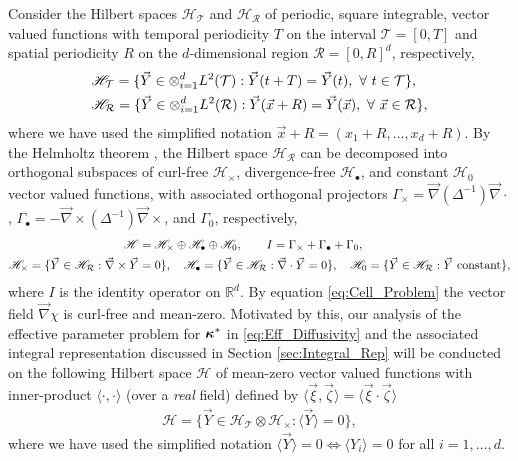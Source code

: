 \documentclass[11pt]{amsart}
\newcommand{\Tc}{\mathcal{T}}
\newcommand{\Rc}{\mathcal{R}}
\newcommand{\Hs}{\mathscr{H}}
\newcommand\bkappa{\mbox{\boldmath${\kappa}$}}
\begin{document}
Consider the Hilbert spaces $\Hs_{\Tc}$ and 
$\Hs_{\Rc}$ of periodic, square integrable, vector
valued functions with temporal periodicity $T$ on the interval
$\Tc=[0,T]$ and spatial periodicity $R$ on the $d$-dimensional
region $\Rc=[0,R]^d$, respectively,
%
\begin{align}
  &\Hs_{\Tc}=\{ 
     \vec{Y}\in\otimes_{i=1}^dL^2(\Tc):
     \vec{Y}(t+T)=\vec{Y}(t), \ \forall \ t\in\Tc
                        \}, \\
  &\Hs_{\Rc}=\{ 
     \vec{Y}\in\otimes_{i=1}^dL^2(\Rc):
     \vec{Y}(\vec{x}+R)=\vec{Y}(\vec{x}), \ \forall \ \vec{x}\in\Rc 
                        \}, \notag
\end{align}
%
where we have used the simplified notation $\vec{x}+R=(x_1+R,\ldots,x_d+R)$.
By the Helmholtz theorem \cite{Denaro:2003:0271,Bhatia:IEE:1077}, the
Hilbert space $\Hs_{\Rc}$ can be decomposed into 
orthogonal subspaces of curl-free $\Hs_\times$, divergence-free
$\Hs_\bullet$, and constant $\Hs_0$ vector valued functions,
with associated orthogonal projectors
$\Gamma_\times=\vec{\nabla}(\Delta^{-1})\vec{\nabla}\cdot$, $\Gamma_\bullet=-\vec{\nabla}\times(\Delta^{-1})\vec{\nabla}\times$, and
$\Gamma_0$, respectively, \cite{Fannjiang:SIAM_JAM:333,MILTON:2002:TC}    
%
\begin{align}\label{eq:Helmholtz}
  \Hs&=\Hs_\times\oplus\Hs_\bullet\oplus\Hs_0,\qquad
  I=\Gamma_\times+\Gamma_\bullet+\Gamma_0, \\  
  \Hs_\times
      =\{\vec{Y}\in\Hs_{\Rc}:\vec{\nabla}\times\vec{Y}&=0\}, \quad
  \Hs_\bullet
      =\{\vec{Y}\in\Hs_{\Rc}:\vec{\nabla}\cdot\vec{Y}=0\},   \quad
  \Hs_0
      =\{\vec{Y}\in\Hs_{\Rc}:\vec{Y} \text{ constant}\},
     \notag  
\end{align}
%
where $I$ is the identity operator on $\mathbb{R}^d$. By equation
\eqref{eq:Cell_Problem} the vector field $\vec{\nabla}\chi$ is 
curl-free and mean-zero. Motivated by this, our analysis of the
effective parameter problem for $\bkappa^*$ in
\eqref{eq:Eff_Diffusivity} and the associated integral representation
discussed in Section \ref{sec:Integral_Rep} will be conducted on the
following Hilbert space $\Hs$ of mean-zero vector valued functions
with inner-product $\langle\cdot,\cdot\rangle$ (over a \emph{real} field) defined by
$\langle\vec{\xi},\vec{\zeta}\rangle=\langle\vec{\xi}\cdot\vec{\zeta}\rangle$ 
%
\begin{align}
  \Hs=\{\vec{Y}\in\Hs_{\Tc}\otimes\Hs_\times: \langle\vec{Y}\rangle=0\},
\end{align}
%
where we have used the simplified notation $\langle\vec{Y}\rangle=0\iff\langle Y_i\rangle=0$ for
all $i=1,\ldots,d$. 
\end{document}
